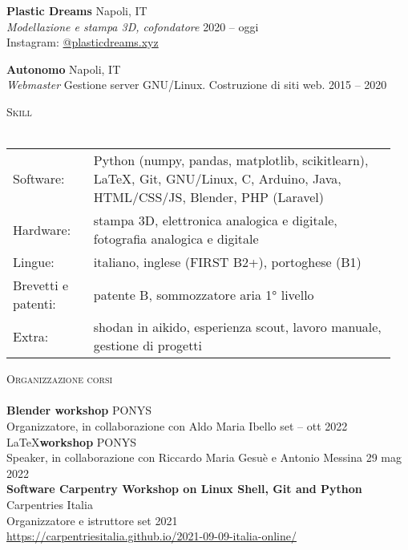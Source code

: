 \documentclass[a4paper]{article}
\newcommand{\lineunder} {
  \vspace*{-8pt} \\
  \hspace*{-18pt} \hrulefill \\
}
\newcommand{\header} [1] {
  {\hspace*{-18pt}\vspace*{6pt} \textsc{#1}}
  \vspace*{-6pt} \lineunder
}
\begin{document}
\textbf{Plastic Dreams} \hfill Napoli, IT\\
\textit{Modellazione e stampa 3D, cofondatore} \hfill 2020 -- oggi\\
Instagram: \href{https://www.instagram.com/plasticdreams.xyz/}{@plasticdreams.xyz}
\vspace{5mm}

\textbf{Autonomo} \hfill Napoli, IT\\
\textit{Webmaster}
Gestione server GNU/Linux.
Costruzione di siti web.
\hfill 2015 -- 2020\\
\vspace{2mm}

\header{Skill}
\begin{tabular}{ p{0.2\linewidth} p{0.75\linewidth} }
  Software: & Python (numpy, pandas, matplotlib, scikitlearn),
              LaTeX, Git, GNU/Linux,
              C, Arduino, Java, HTML/CSS/JS,
              Blender, PHP (Laravel) \\
  Hardware: & stampa 3D,
              elettronica analogica e digitale,
              fotografia analogica e digitale  \\
  Lingue:   & italiano,
              inglese (FIRST B2+),
              portoghese (B1) \\
  Brevetti e patenti: & patente B,
                        sommozzatore aria 1° livello \\
  Extra: & shodan in aikido,
           esperienza scout,
           lavoro manuale,
           gestione di progetti
\end{tabular}
\vspace{2mm}

\header{Organizzazione corsi}
\textbf{Blender workshop} \hfill PONYS\\
Organizzatore, in collaborazione con Aldo Maria Ibello \hfill set -- ott 2022\\
\vspace*{2mm}
\LaTeX \textbf{workshop} \hfill PONYS \\
Speaker, in collaborazione con Riccardo Maria Gesuè e Antonio Messina \hfill 29 mag 2022 \\
\vspace*{2mm}
\textbf{Software Carpentry Workshop on Linux Shell, Git and Python} \hfill Carpentries Italia\\
Organizzatore e istruttore \hfill set 2021 \\
\url{https://carpentriesitalia.github.io/2021-09-09-italia-online/} \\
\vspace*{2mm}
\end{document}
